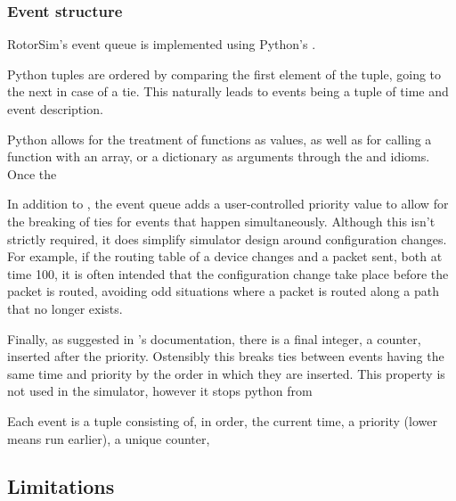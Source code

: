 

\subsubsection{Event structure} \label{rotorsim-eventq-event}
RotorSim's event queue is implemented using Python's  \cite{noauthor_heapq_nodate}.

Python tuples are ordered by comparing the first element of the tuple, going to the next in case of a tie.
This naturally leads to events being a tuple of time and event description.

Python allows for the treatment of functions as values, as well as for calling a function with an array, or a dictionary as arguments through the  and  idioms. 
Once the 

In addition to , the event queue adds a user-controlled priority value to allow for the breaking of ties for events that happen simultaneously.
Although this isn't strictly required, it does simplify simulator design around configuration changes.
For example, if the routing table of a device changes and a packet sent, both at time 100, it is often intended that the configuration change take place before the packet is routed, avoiding odd situations where a packet is routed along a path that no longer exists. 

Finally, as suggested in 's documentation, there is a final integer, a counter, inserted after the priority. Ostensibly this breaks ties between events having the same time and priority by the order in which they are inserted.
This property is not used in the simulator, however it stops python from 

Each event is a tuple consisting of, in order, the current time, a priority (lower means run earlier), a unique counter, 



\subsection{Limitations} \label{rotorsim-limits}

